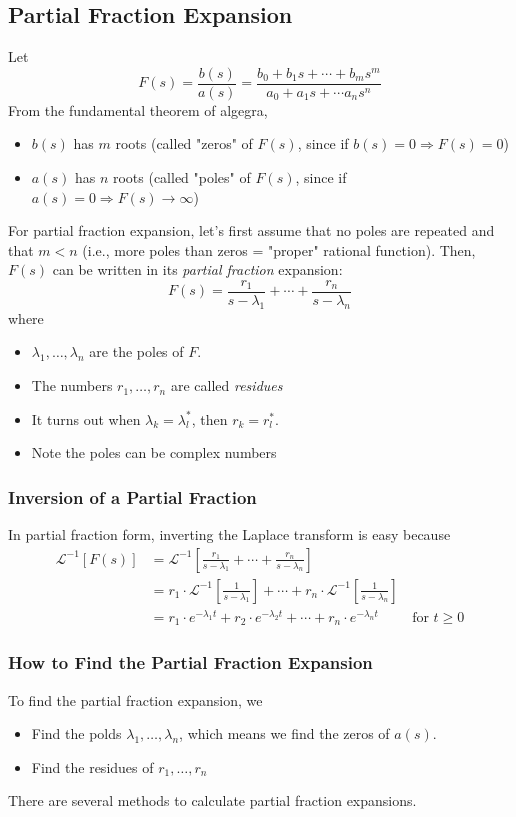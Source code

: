 \documentclass[10pt]{article}
\newcommand{\laplace}{\mathcal{L}}
\begin{document}
\subsection*{Partial Fraction Expansion}
Let
\[F(s) = \frac{b(s)}{a(s)} = \frac{b_0 + b_1 s + \cdots + b_m s^m}{a_0 + a_1 s + \cdots a_n s^n}\]
From the fundamental theorem of algegra,
\begin{itemize}
    \item $b(s)$ has $m$ roots (called "zeros" of $F(s)$, since if $b(s) = 0 \Rightarrow F(s) = 0$)
    \item $a(s)$ has $n$ roots (called "poles" of $F(s)$, since if $a(s) = 0 \Rightarrow F(s) \rightarrow \infty$)
\end{itemize}
For partial fraction expansion, let's first assume that no poles are repeated and that $m < n$ (i.e., more poles than zeros = "proper" rational function).  Then, $F(s)$ can be written in its \textit{partial fraction} expansion:
\[F(s) = \frac{r_1}{s - \lambda_1} + \cdots + \frac{r_n}{s - \lambda_n}\]
where
\begin{itemize}
    \item $\lambda_1, \dots, \lambda_n$ are the poles of $F$.
    \item The numbers $r_1, \dots, r_n$ are called \textit{residues}
    \item It turns out when $\lambda_k = \lambda_l^*$, then $r_k = r_l^*$.
    \item Note the poles can be complex numbers
\end{itemize}
\subsubsection*{Inversion of a Partial Fraction}
In partial fraction form, inverting the Laplace transform is easy because
\begin{align*}
    \laplace^{-1}[F(s)]  &= \laplace^{-1}\left[\frac{r_1}{s - \lambda_1} + \cdots + \frac{r_n}{s - \lambda_n}\right]\\
    &= r_1 \cdot \laplace^{-1} \left[\frac{1}{s - \lambda_1}\right] + \cdots + r_n \cdot \laplace^{-1} \left[\frac{1}{s - \lambda_n}\right]\\
    &= r_1 \cdot e^{-\lambda_1 t} + r_2 \cdot e^{-\lambda_2 t} + \cdots + r_n \cdot e^{-\lambda_n t}\hspace{1cm}\text{for $t \geq 0$}
\end{align*}
\subsubsection*{How to Find the Partial Fraction Expansion}
To find the partial fraction expansion, we
\begin{itemize}
    \item Find the polds $\lambda_1, \dots, \lambda_n$, which means we find the zeros of $a(s)$.
    \item Find the residues of $r_1, \dots, r_n$
\end{itemize}
There are several methods to calculate partial fraction expansions.
\end{document}
